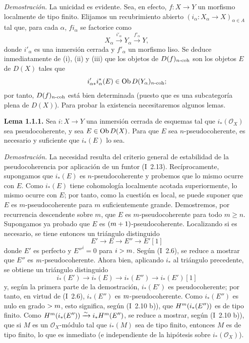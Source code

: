 \emph{Demostración.} La unicidad es evidente. Sea, en efecto, \(f:X\to Y\) un morfismo localmente de tipo finito. Elijamos un recubrimiento abierto \((i_\alpha:X_\alpha\to X)_{\alpha\in A}\) tal que, para cada \(\alpha\), \(fi_\alpha\) se factorice como
\[
 X_\alpha\xrightarrow{i'_\alpha}Y_\alpha\xrightarrow{f'_\alpha}Y,
\]
donde \(i'_\alpha\) es una inmersión cerrada y \(f'_\alpha\) un morfismo liso. Se deduce inmediatamente de (i), (ii) y (iii) que los objetos de \(D(f)_{n\text{-}\coh}\) son los objetos \(E\) de \(D(X)\) tales que
\[
 i'_{\alpha *}i_\alpha^*(E)\in \Ob D(Y_\alpha)_{n\text{-}\coh};
\]
por tanto, \(D(f)_{n\text{-}\coh}\) está bien determinada (puesto que es una subcategoría plena de \(D(X)\)). Para probar la existencia necesitaremos algunos lemas.

\textbf{Lema 1.1.1.} Sea \(i:X\to Y\) una inmersión cerrada de esquemas tal que \(i_*(\mathcal O_X)\) sea pseudocoherente, y sea \(E\in\Ob D(X)\). Para que \(E\) sea \(n\)-pseudocoherente, es necesario y suficiente que \(i_*(E)\) lo sea.

\emph{Demostración.} La necesidad resulta del criterio general de estabilidad de la pseudocoherencia por aplicación de un funtor (I~2.13). Recíprocamente, supongamos que \(i_*(E)\) es \(n\)-pseudocoherente y probemos que lo mismo ocurre con \(E\). Como \(i_*(E)\) tiene cohomología localmente acotada superiormente, lo mismo ocurre con \(E\); por tanto, como la cuestión es local, se puede suponer que \(E\) es \(m\)-pseudocoherente para \(m\) suficientemente grande. Demostremos, por recurrencia descendente sobre \(m\), que \(E\) es \(m\)-pseudocoherente para todo \(m\geq n\). Supongamos ya probado que \(E\) es \((\sisi{n}{m}+1)\)-pseudocoherente. Localizando si es necesario, se tiene entonces un triángulo distinguido
\[
E'\longrightarrow E\longrightarrow E''\longrightarrow E'[1]
\]
donde \(E'\) es perfecto y \(E''^i=0\) para \(i>\sisi{n}{m}\). Según (I~2.6), se reduce a mostrar que \(E''\) es \(\sisi{n}{m}\)-pseudocoherente. Ahora bien, aplicando \(i_*\) al triángulo precedente, se obtiene un triángulo distinguido
\[
i_*(E')\longrightarrow i_*(E)\longrightarrow i_*(E'')\longrightarrow i_*(E')[1]
\]
y, según la primera parte de la demostración, \(i_*(E')\) es pseudocoherente; por tanto, en virtud de (I~2.6), \(i_*(E'')\) es \(\sisi{n}{m}\)-pseudocoherente. Como \(i_*(E'')\) es nulo en grado \(>\sisi{n}{m}\), esto significa, según (I~2.10 b)), que \(H^\sisi{n}{m}(i_*(E''))\) es de tipo finito. Como \(H^\sisi{n}{m}(i_*(E''))\xrightarrow{\sim}i_*H^\sisi{n}{m}(E'')\), se reduce a mostrar, según (I~2.10 b)), que si \(M\) es un \(\mathcal O_X\)-módulo tal que \(i_*(M)\) sea de tipo finito, entonces \(M\) es de tipo finito, lo que es inmediato (e independiente de la hipótesis sobre \(i_*(\mathcal O_X)\)).

